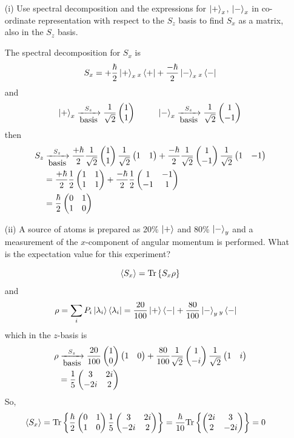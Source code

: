 \documentclass[english, 11pt]{article}
\begin{document}
      \begin{exmp}
        \begin{itemize}
          \item[(i)] Use spectral decomposition and the expressions for $\left|+\right\rangle_x$, $\left|-\right\rangle_x$ in co-ordinate representation with respect to the $S_z$ basis to find $S_x$ as a matrix, also in the $S_z$ basis.\newline

          The spectral decomposition for $S_x$ is
          \[ S_x = +\frac{\hbar}{2}\left|+\right\rangle_x{}_x\left\langle+\right| + \frac{-\hbar}{2}\left|-\right\rangle_x{}_x\left\langle-\right| \]
          and
          \[ \left|+\right\rangle_x \xrightarrow[\mbox{basis}]{S_z} \frac{1}{\sqrt{2}}\left(\begin{matrix}1 \\ 1\end{matrix}\right) \ \ \ \ \ \ \ \ \left|-\right\rangle_x \xrightarrow[\mbox{basis}]{S_z} \frac{1}{\sqrt{2}}\left(\begin{matrix}1 \\ -1\end{matrix}\right) \]
          then
          \begin{align*}
            S_z & \xrightarrow[\mbox{basis}]{S_z} \frac{+\hbar}{2}\frac{1}{\sqrt{2}}\left(\begin{matrix}1 \\ 1\end{matrix}\right)\frac{1}{\sqrt{2}}\left(\begin{matrix}1 & 1\end{matrix}\right) + \frac{-\hbar}{2}\frac{1}{\sqrt{2}}\left(\begin{matrix}1 \\ -1\end{matrix}\right)\frac{1}{\sqrt{2}}\left(\begin{matrix}1 & -1\end{matrix}\right)\\
            & = \frac{+\hbar}{2}\frac{1}{2}\left(\begin{matrix}1 & 1 \\ 1 & 1\end{matrix}\right) + \frac{-\hbar}{2}\frac{1}{2}\left(\begin{matrix}1 & -1 \\ -1 & 1\end{matrix}\right) \\
            & = \frac{\hbar}{2} \left(\begin{matrix}0 & 1 \\ 1 & 0\end{matrix}\right)
          \end{align*}
          \item[(ii)] A source of atoms is prepared as 20\% $\left|+\right\rangle$ and 80\% $\left|-\right\rangle_y$ and a measurement of the $x$-component of angular momentum is performed. What is the expectation value for this experiment?\newline

          \[ \langle S_x \rangle = \mbox{Tr}\left\{ S_x\rho \right\} \]
          and
          \begin{align*}
            \rho & = \sum_i P_i \left|\lambda_i\right\rangle\left\langle\lambda_i\right| = \frac{20}{100}\left|+\right\rangle\left\langle-\right| + \frac{80}{100}\left|-\right\rangle_y{}_y\left\langle-\right|
          \end{align*}
          which in the $z$-basis is
          \begin{align*}
            \rho & \xrightarrow[\mbox{basis}]{S_z} \frac{20}{100}\left(\begin{matrix}1 \\ 0\end{matrix}\right)\left(\begin{matrix}1 & 0\end{matrix}\right) + \frac{80}{100}\frac{1}{\sqrt{2}}\left(\begin{matrix}1 \\ -i\end{matrix}\right) \frac{1}{\sqrt{2}}\left(\begin{matrix}1 & i\end{matrix}\right) \\
            & = \frac{1}{5}\left(\begin{matrix}3 & 2i \\ -2i & 2\end{matrix}\right)
          \end{align*}
          So,
          \begin{align*}
            \langle S_x \rangle & = \mbox{Tr}\left\{ \frac{\hbar}{2}\left(\begin{matrix}0 & 1 \\ 1 & 0\end{matrix}\right)\frac{1}{5}\left(\begin{matrix}3 & 2i \\ -2i & 2\end{matrix}\right) \right\} = \frac{\hbar}{10}\mbox{Tr}\left\{ \left(\begin{matrix}2i & 3 \\ 2 & -2i\end{matrix}\right) \right\} = 0
          \end{align*}
        \end{itemize}
      \end{exmp}
\end{document}
